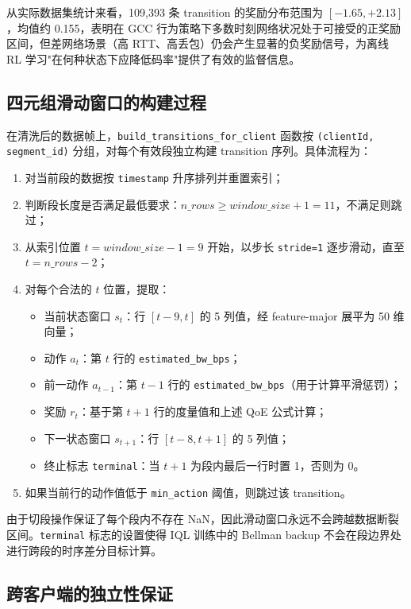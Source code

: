 从实际数据集统计来看，109,393 条 transition 的奖励分布范围为 $[-1.65, +2.13]$，均值约 0.155，表明在 GCC 行为策略下多数时刻网络状况处于可接受的正奖励区间，但差网络场景（高 RTT、高丢包）仍会产生显著的负奖励信号，为离线 RL 学习"在何种状态下应降低码率"提供了有效的监督信息。

\subsection{四元组滑动窗口的构建过程}

在清洗后的数据帧上，\texttt{build\_transitions\_for\_client} 函数按 \texttt{(clientId, segment\_id)} 分组，对每个有效段独立构建 transition 序列。具体流程为：

\begin{enumerate}
    \item 对当前段的数据按 \texttt{timestamp} 升序排列并重置索引；
    \item 判断段长度是否满足最低要求：$n\_rows \geq window\_size + 1 = 11$，不满足则跳过；
    \item 从索引位置 $t = window\_size - 1 = 9$ 开始，以步长 \texttt{stride=1} 逐步滑动，直至 $t = n\_rows - 2$；
    \item 对每个合法的 $t$ 位置，提取：
    \begin{itemize}
        \item 当前状态窗口 $s_t$：行 $[t-9, t]$ 的 5 列值，经 feature-major 展平为 50 维向量；
        \item 动作 $a_t$：第 $t$ 行的 \texttt{estimated\_bw\_bps}；
        \item 前一动作 $a_{t-1}$：第 $t-1$ 行的 \texttt{estimated\_bw\_bps}（用于计算平滑惩罚）；
        \item 奖励 $r_t$：基于第 $t+1$ 行的度量值和上述 QoE 公式计算；
        \item 下一状态窗口 $s_{t+1}$：行 $[t-8, t+1]$ 的 5 列值；
        \item 终止标志 \texttt{terminal}：当 $t+1$ 为段内最后一行时置 1，否则为 0。
    \end{itemize}
    \item 如果当前行的动作值低于 \texttt{min\_action} 阈值，则跳过该 transition。
\end{enumerate}

由于切段操作保证了每个段内不存在 NaN，因此滑动窗口永远不会跨越数据断裂区间。\texttt{terminal} 标志的设置使得 IQL 训练中的 Bellman backup 不会在段边界处进行跨段的时序差分目标计算。

\subsection{跨客户端的独立性保证}

